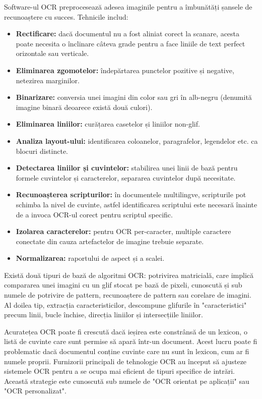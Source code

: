 \documentclass[a4paper,12pt]{report}
\begin{document}
Software-ul OCR preprocesează adesea imaginile pentru a îmbunătăți șansele de recunoaștere cu succes. Tehnicile includ:
\begin{itemize}
    \item \textbf{Rectificare:} dacă documentul nu a fost aliniat corect la scanare, acesta poate necesita o înclinare câteva grade pentru a face liniile de text perfect orizontale sau verticale.
    \item \textbf{Eliminarea zgomotelor:} îndepărtarea punctelor pozitive și negative, netezirea marginilor.
    \item \textbf{Binarizare:} conversia unei imagini din color sau gri în alb-negru (denumită imagine binară deoarece există două culori).
    \item \textbf{Eliminarea liniilor:} curățarea casetelor și liniilor non-glif.
    \item \textbf{Analiza layout-ului:} identificarea coloanelor, paragrafelor, legendelor etc. ca blocuri distincte.
    \item \textbf{Detectarea liniilor și cuvintelor:} stabilirea unei linii de bază pentru formele cuvintelor și caracterelor, separarea cuvintelor după necesitate.
    \item \textbf{Recunoașterea scripturilor:} în documentele multilingve, scripturile pot schimba la nivel de cuvinte, astfel identificarea scriptului este necesară înainte de a invoca OCR-ul corect pentru scriptul specific.
    \item \textbf{Izolarea caracterelor:} pentru OCR per-caracter, multiple caractere conectate din cauza artefactelor de imagine trebuie separate.
    \item \textbf{Normalizarea:} raportului de aspect și a scalei.
\end{itemize}

Există două tipuri de bază de algoritmi OCR: potrivirea matricială, care implică compararea unei imagini cu un glif stocat pe bază de pixeli, cunoscută și sub numele de potrivire de pattern, recunoaștere de pattern sau corelare de imagini. Al doilea tip, extracția caracteristicilor, descompune glifurile în "caracteristici" precum linii, bucle închise, direcția liniilor și intersecțiile liniilor.

Acuratețea OCR poate fi crescută dacă ieșirea este constrânsă de un lexicon, o listă de cuvinte care sunt permise să apară într-un document. Acest lucru poate fi problematic dacă documentul conține cuvinte care nu sunt în lexicon, cum ar fi numele proprii. Furnizorii principali de tehnologie OCR au început să ajusteze sistemele OCR pentru a se ocupa mai eficient de tipuri specifice de intrări. Această strategie este cunoscută sub numele de "OCR orientat pe aplicații" sau "OCR personalizat".
\end{document}
